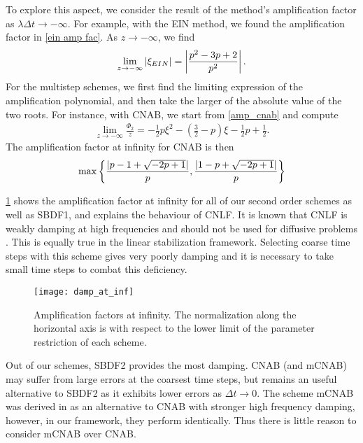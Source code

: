 To explore this aspect, we consider the result of the method's amplification factor as $\lambda\Delta t \to -\infty$. For example, with the EIN method, we found the amplification factor in \cref{ein amp fac}. As $z\to -\infty$, we find 
\begin{align}
        \lim_{z\to-\infty} \left|\xi_{EIN}\right| = \left|\frac{p^2-3p+2}{p^2}\right|.
\end{align}
For the multistep schemes, we first find the limiting expression of the amplification polynomial, and then take the larger of the absolute value of the two roots. For instance, with CNAB, we start from \cref{amp_cnab} and compute
\begin{align}
        \lim_{z\to-\infty} \frac{\Phi_2}{z}
= -\frac{1}{2}p\xi^2-\left(\frac{3}{2}-p\right)\xi-\frac{1}{2}p+\frac{1}{2}.
\end{align}
The amplification factor at infinity for CNAB is then 
\begin{align}
\max\left\{ \frac{\left|p-1+\sqrt{-2p+1}\right|}{p}, \frac{\left|1-p+\sqrt{-2p+1}\right|}{p}\right\}
\end{align}

\cref{fig:damp fac at inf} shows the amplification factor at infinity for all of our second order schemes as well as SBDF1, and explains the behaviour of CNLF. It is known that CNLF is weakly damping at high frequencies and should not be used for diffusive problems \cite{ascher1995implicit}. This is equally true in the linear stabilization framework. Selecting coarse time steps with this scheme gives very poorly damping and it is necessary to take small time steps to combat this deficiency.

\begin{figure}[htb!]
	\centering 
\texttt{[image: damp\_at\_inf]}
\caption[Amplification factors at infinity.]{Amplification factors at infinity. The normalization along the horizontal axis is with respect to the lower limit of the parameter restriction of each scheme.}
\label{fig:damp fac at inf}
\end{figure}

Out of our schemes, SBDF2 provides the most damping. CNAB (and mCNAB) may suffer from large errors at the coarsest time steps, but remains an useful alternative to SBDF2 as it exhibits lower errors as $\Delta t\to 0$. The scheme mCNAB was derived in \cite{ascher1995implicit} as an alternative to CNAB with stronger high frequency damping, however, in our framework, they perform identically. Thus there is little reason to consider mCNAB over CNAB.

